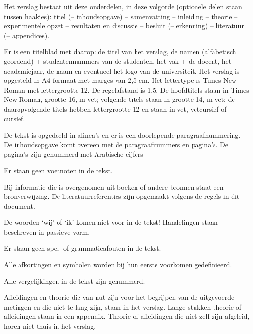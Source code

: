 
\begin{checklist}
    \checkeditem
        Het verslag bestaat uit deze onderdelen, in deze volgorde (optionele delen staan tussen haakjes): titel (– inhoudsopgave) – samenvatting – inleiding – theorie – experimentele opzet – resultaten en discussie – besluit (– erkenning) – literatuur (– appendices).
    \item
        Er is een titelblad met daarop: de titel van het verslag, de namen (alfabetisch geordend) + studentennummers van de studenten, het vak + de docent, het academiejaar, de naam en eventueel het logo van de universiteit.
    \checkeditem
        Het verslag is opgesteld in A4-formaat met marges van 2,5 cm. Het lettertype is Times New Roman met lettergrootte 12. De regelafstand is 1,5.
    \checkeditem
        De hoofdtitels staan in Times New Roman, grootte 16, in vet; volgende titels staan in grootte 14, in vet; de daaropvolgende titels hebben lettergrootte 12 en staan in vet, vetcursief of cursief.
    \item
        De tekst is opgedeeld in alinea’s en er is een doorlopende paragraafnummering.
    \checkeditem
        De inhoudsopgave komt overeen met de paragraafnummers en pagina’s.
    \checkeditem
        De pagina’s zijn genummerd met Arabische cijfers
    \item
        Er staan geen voetnoten in de tekst.
    \item
        Bij informatie die is overgenomen uit boeken of andere bronnen staat een bronverwijzing. De literatuurreferenties zijn opgemaakt volgens de regels in dit document.
    \item
        De woorden ‘wij’ of ‘ik’ komen niet voor in de tekst! Handelingen staan beschreven in passieve vorm.
    \item
        Er staan geen spel- of grammaticafouten in de tekst.
    \item
        Alle afkortingen en symbolen worden bij hun eerste voorkomen gedefinieerd.
    \item
        Alle vergelijkingen in de tekst zijn genummerd.
    \item
        Afleidingen en theorie die van nut zijn voor het begrijpen van de uitgevoerde metingen en die niet te lang zijn, staan in het verslag. Lange stukken theorie of afleidingen staan in een appendix. Theorie of afleidingen die niet zelf zijn afgeleid, horen niet thuis in het verslag.

\end{checklist}
